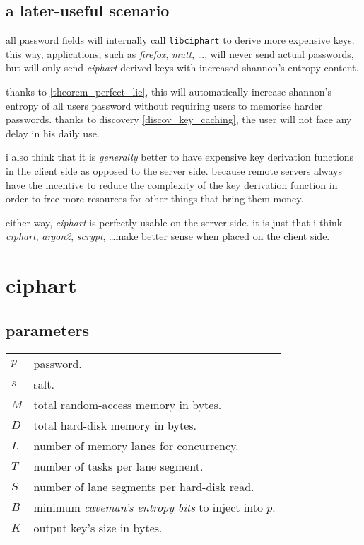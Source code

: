 \documentclass[twocolumn]{article}
\begin{document}
\subsection{a later-useful scenario}
all password fields will internally call \texttt{libciphart} to derive more
expensive keys.  this way, applications, such as \emph{firefox},
\emph{mutt}, \ldots, will never send actual passwords, but will only send
\emph{ciphart}-derived keys with increased shannon's entropy content.

thanks to \cref{theorem_perfect_lie}, this will automatically increase
shannon's entropy of all users password without requiring users to memorise
harder passwords.  thanks to discovery \ref{discov_key_caching}, the user
will not face any delay in his daily use.

i also think that it is \emph{generally} better to have expensive key
derivation functions in the client side as opposed to the server side.
because remote servers always have the incentive to reduce the complexity
of the key derivation function in order to free more resources for other
things that bring them money.

either  way, \emph{ciphart} is perfectly usable on the server side.  it is
just that i think \emph{ciphart}, \emph{argon2}, \emph{scrypt}, \ldots make
better sense when placed on the client side.

\section{ciphart}
\subsection{parameters}
\begin{tabularx}{\columnwidth}{lX}
    $p$ & password.\\
    $s$ & salt.\\
    $M$ & total random-access memory in bytes.\\
    $D$ & total hard-disk memory in bytes.\\
    $L$ & number of memory lanes for concurrency.\\
    $T$ & number of tasks per lane segment.\\
    $S$ & number of lane segments per hard-disk read.\\
    $B$ & minimum \emph{caveman's entropy bits} to inject into $p$.\\
    $K$ & output key's size in bytes.\\
\end{tabularx}
\end{document}
